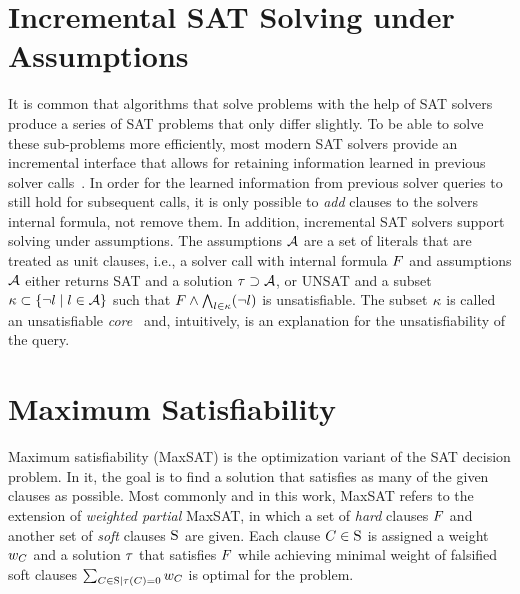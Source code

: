\section{Incremental SAT Solving under Assumptions\label{sec:inc-sat}}

It is common that algorithms that solve problems with the help of SAT solvers produce a series of SAT problems that only differ slightly.
To be able to solve these sub-problems more efficiently, most modern SAT solvers provide an incremental interface that allows for retaining information learned in previous solver calls~\autocite{DBLP:journals/entcs/EenS03,handbook2-cdcl}.
In order for the learned information  from previous solver queries to still hold for subsequent calls, it is only possible to \emph{add} clauses to the solvers internal formula, not remove them.
In addition, incremental SAT solvers support solving under assumptions.
The assumptions $\mathcal{A}$ are a set of literals that are treated as unit clauses, i.e., a solver call with internal formula $F$ and assumptions $\mathcal{A}$ either returns SAT and a solution $\tau \supset \mathcal{A}$, or UNSAT and a subset $\kappa \subset \{\lnot l \mid l\in\mathcal{A}\}$ such that $F \land \bigwedge_{l \in \kappa} (\lnot l)$ is unsatisfiable.
The subset $\kappa$ is called an unsatisfiable \emph{core}~\autocite{} and, intuitively, is an explanation for the unsatisfiability of the query.


\section{Maximum Satisfiability\label{sec:max-sat}}

Maximum satisfiability (MaxSAT) is the optimization variant of the SAT decision problem.
In it, the goal is to find a solution that satisfies as many of the given clauses as possible.
Most commonly and in this work, MaxSAT refers to the extension of \emph{weighted partial} MaxSAT, in which a set of \emph{hard} clauses $F$ and another set of \emph{soft} clauses $\textsc{S}$ are given.
Each clause $C \in \textsc{S}$ is assigned a weight $w_C$ and a solution $\tau$ that satisfies $F$ while achieving minimal weight of falsified soft clauses $\sum_{C\in\textsc{S} \mid \tau(C)=0} w_C$ is optimal for the problem.

